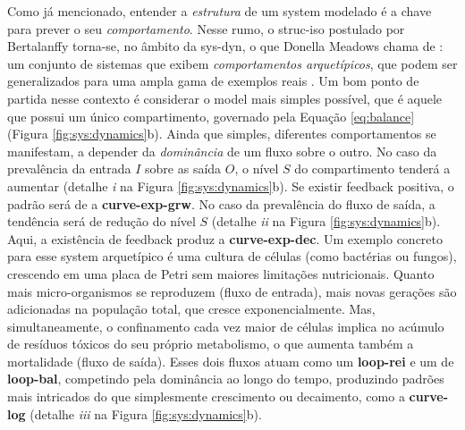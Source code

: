 \documentclass[./main.tex]{subfiles}
\begin{document}
\par  Como já mencionado, entender a \textit{estrutura} de um \gls{system} modelado é a chave para prever o seu \textit{comportamento}. Nesse rumo, o \gls{struc-iso} postulado por Bertalanffy torna-se, no âmbito da \gls{sys-dyn}, o que Donella Meadows chama de : um conjunto de sistemas que exibem \textit{comportamentos arquetípicos}, que podem ser generalizados para uma ampla gama de exemplos reais \cite{meadows2008}. Um bom ponto de partida nesse contexto é considerar o \gls{model} mais simples possível, que é aquele que possui um único compartimento, governado pela Equação \eqref{eq:balance} (Figura \ref{fig:sys:dynamics}b). Ainda que simples, diferentes comportamentos se manifestam, a depender da \textit{dominância} de um fluxo sobre o outro. No caso da prevalência da entrada $I$ sobre as saída $O$, o nível $S$ do compartimento tenderá a aumentar (detalhe \textrm{\textit{i}} na Figura \ref{fig:sys:dynamics}b). Se existir \gls{feedback} positiva, o padrão será de a \textbf{\gls{curve-exp-grw}}. No caso da prevalência do fluxo de saída, a tendência será de redução do nível $S$ (detalhe \textrm{\textit{ii}} na Figura \ref{fig:sys:dynamics}b). Aqui, a existência de \gls{feedback} produz a \textbf{\gls{curve-exp-dec}}. Um exemplo concreto para esse \gls{system} arquetípico é uma cultura de células (como bactérias ou fungos), crescendo em uma placa de Petri sem maiores limitações nutricionais. Quanto mais micro-organismos se reproduzem (fluxo de entrada), mais novas gerações são adicionadas na população total, que cresce exponencialmente. Mas, simultaneamente, o confinamento cada vez maior de células implica no acúmulo de resíduos tóxicos do seu próprio metabolismo, o que aumenta também a mortalidade (fluxo de saída). Esses dois fluxos atuam como um \textbf{\gls{loop-rei}} e um de \textbf{\gls{loop-bal}}, competindo pela dominância ao longo do tempo, produzindo padrões mais intricados do que simplesmente crescimento ou decaimento, como a \textbf{\gls{curve-log}} (detalhe \textrm{\textit{iii}} na Figura \ref{fig:sys:dynamics}b). 
\end{document}
